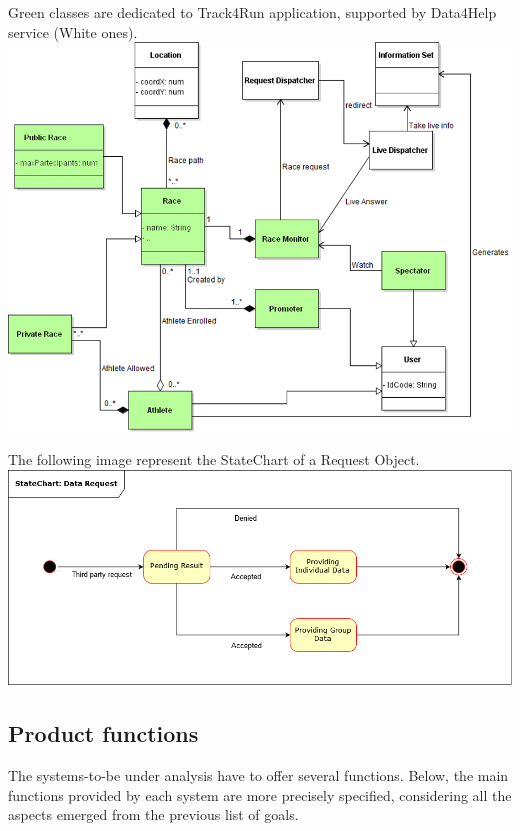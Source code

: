 \begin{minipage}{\textwidth}
\begin{center}
{\color{LimeGreen} Green classes} are dedicated to {\color{LimeGreen} Track4Run} application, supported by Data4Help service (White ones).
\includegraphics[scale=0.7]{Images/Class_Track4Run.png}
\end{center}
\end{minipage}

\begin{minipage}{\textwidth}
\begin{center}
The following image represent the StateChart of a Request Object.
\includegraphics[scale=0.5]{Images/StateChart.png}
\end{center}
\end{minipage}


\subsection{Product functions}
The systems-to-be under analysis have to offer several functions. Below, the main functions provided by each system are more precisely specified, considering all the aspects emerged from the previous list of goals.
